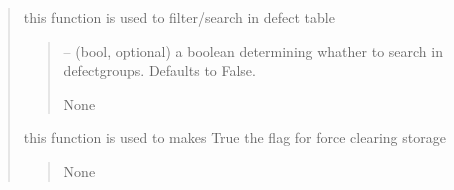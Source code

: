 \documentclass[letterpaper,10pt,english]{sphinxmanual}
\begin{document}
\begin{quote}
\begin{savenotes}
\begin{fulllineitems}
\begin{savenotes}\begin{fulllineitems}
\label{\detokenize{setting/setting_api:oxin.setting_api.API.filter_defects}}
\pysigstartsignatures
{}
\pysigstopsignatures
\sphinxAtStartPar
this function is used to filter/search in defect table
\begin{quote}\begin{description}
\sphinxAtStartPar
{} – (bool, optional) a boolean determining whather to search in defect\sphinxhyphen{}groups. Defaults to False.

\sphinxAtStartPar
None

\end{description}\end{quote}

\end{fulllineitems}\end{savenotes}


\begin{savenotes}\begin{fulllineitems}
\label{\detokenize{setting/setting_api:oxin.setting_api.API.force_clear_camera_live_storage}}
\pysigstartsignatures
{}
\pysigstopsignatures
\sphinxAtStartPar
this function is used to makes True the flag for force clearing storage
\begin{quote}\begin{description}
\sphinxAtStartPar
None

\end{description}\end{quote}

\end{fulllineitems}\end{savenotes}



\end{fulllineitems}
\end{savenotes}
\end{quote}
\end{document}
